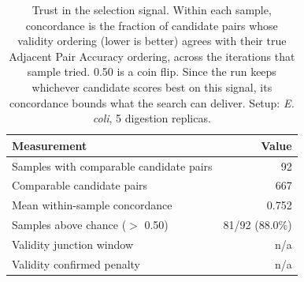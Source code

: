\begin{table}[!tb]
  \centering
  \caption{Trust in the selection signal. Within each sample, concordance is the fraction of candidate pairs whose validity ordering (lower is better) agrees with their true Adjacent Pair Accuracy ordering, across the iterations that sample tried. 0.50 is a coin flip. Since the run keeps whichever candidate scores best on this signal, its concordance bounds what the search can deliver. Setup: \textnormal{\textnormal{\textit{E. coli}}}, 5 digestion replicas.}
  \label{tab:validity_concordance_ecoli_r5}
  \begin{tabular}{lr}
    \toprule
    Measurement & Value \\
    \midrule
    Samples with comparable candidate pairs & 92 \\
    Comparable candidate pairs & 667 \\
    Mean within-sample concordance & 0.752 \\
    Samples above chance ($>$ 0.50) & 81/92 (88.0\%) \\
    Validity junction window & n/a \\
    Validity confirmed penalty & n/a \\
    \bottomrule
  \end{tabular}
\end{table}
